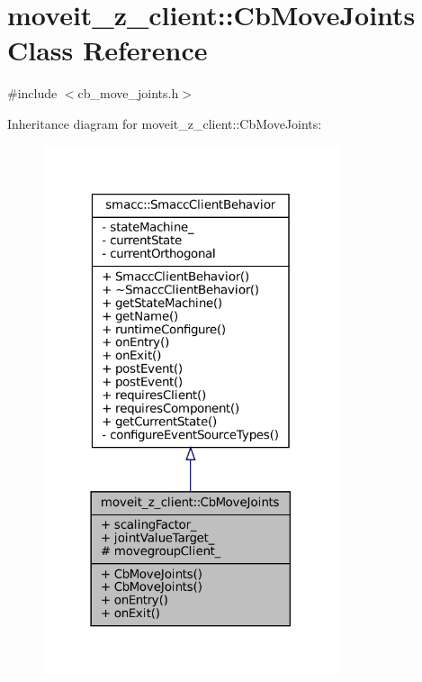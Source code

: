 \hypertarget{classmoveit__z__client_1_1CbMoveJoints}{}\section{moveit\+\_\+z\+\_\+client\+:\+:Cb\+Move\+Joints Class Reference}
\label{classmoveit__z__client_1_1CbMoveJoints}


{\ttfamily \#include $<$cb\+\_\+move\+\_\+joints.\+h$>$}



Inheritance diagram for moveit\+\_\+z\+\_\+client\+:\+:Cb\+Move\+Joints\+:
\nopagebreak
\begin{figure}[H]
\begin{center}
\leavevmode
\includegraphics[width=246pt]{classmoveit__z__client_1_1CbMoveJoints__inherit__graph}
\end{center}
\end{figure}


